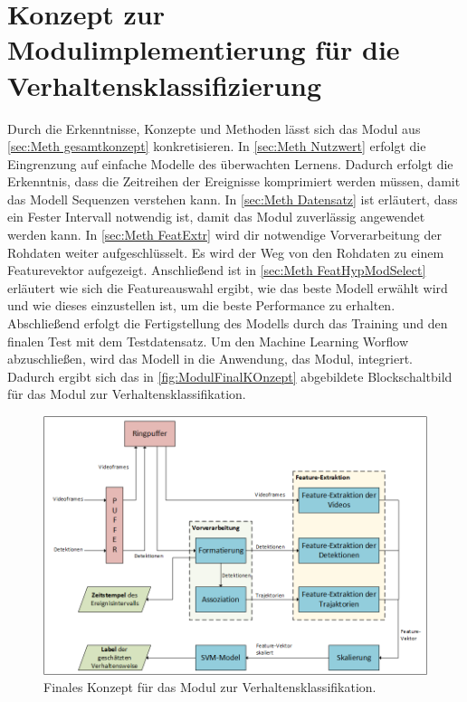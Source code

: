 \section{Konzept zur Modulimplementierung für die Verhaltensklassifizierung} \label{sec:Meth FinalKonzept}
Durch die Erkenntnisse, Konzepte und Methoden lässt sich das Modul aus \autoref{sec:Meth gesamtkonzept} konkretisieren. In \autoref{sec:Meth Nutzwert} erfolgt die Eingrenzung auf einfache Modelle des überwachten Lernens. Dadurch erfolgt die Erkenntnis, dass die Zeitreihen der Ereignisse komprimiert werden müssen, damit das Modell Sequenzen verstehen kann. In \autoref{sec:Meth Datensatz} ist erläutert, dass ein Fester Intervall notwendig ist, damit das Modul zuverlässig angewendet werden kann. In \autoref{sec:Meth FeatExtr} wird dir notwendige Vorverarbeitung der Rohdaten weiter aufgeschlüsselt. Es wird der Weg von den Rohdaten zu einem Featurevektor aufgezeigt. Anschließend ist in \autoref{sec:Meth FeatHypModSelect} erläutert wie sich die Featureauswahl ergibt, wie das beste Modell erwählt wird und wie dieses einzustellen ist, um die beste Performance zu erhalten. Abschließend erfolgt die Fertigstellung des Modells durch das Training und den finalen Test mit dem Testdatensatz. Um den Machine Learning Worflow abzuschließen, wird das Modell in die Anwendung, das Modul, integriert. Dadurch ergibt sich das in \autoref{fig:ModulFinalKOnzept} abgebildete Blockschaltbild für das Modul zur Verhaltensklassifikation.


\begin{figure}[htb]
    \centering
    \includegraphics[width=\textwidth]{img/Grafiken/Gesamtkonzept Final.png}
    \caption[Finales Konzept für das Modul zur Verhaltensklassifikation.]{Finales Konzept für das Modul zur Verhaltensklassifikation.}
    \label{fig:ModulFinalKOnzept}
\end{figure}


